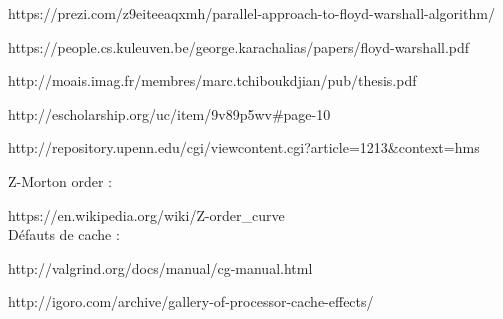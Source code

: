 \documentclass[a4paper,11pt]{article}
\begin{document}
https://prezi.com/z9eiteeaqxmh/parallel-approach-to-floyd-warshall-algorithm/

https://people.cs.kuleuven.be/george.karachalias/papers/floyd-warshall.pdf

http://moais.imag.fr/membres/marc.tchiboukdjian/pub/thesis.pdf

http://escholarship.org/uc/item/9v89p5wv\#page-10

http://repository.upenn.edu/cgi/viewcontent.cgi?article=1213\&context=hms


\noindent Z-Morton order :

https://en.wikipedia.org/wiki/Z-order\_curve\\


\noindent Défauts de cache :

http://valgrind.org/docs/manual/cg-manual.html

http://igoro.com/archive/gallery-of-processor-cache-effects/
\end{document}
